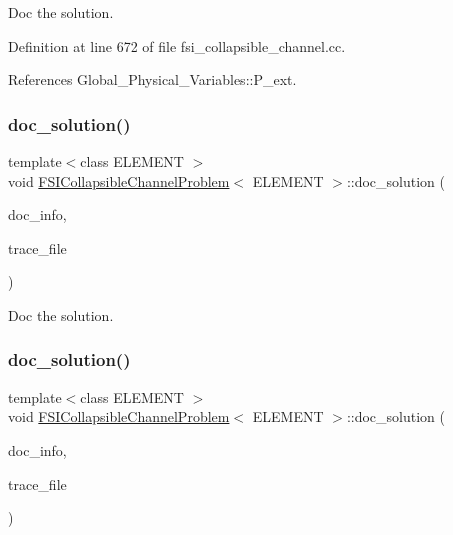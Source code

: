 Doc the solution. 



Definition at line 672 of file fsi\+\_\+collapsible\+\_\+channel.\+cc.



References Global\+\_\+\+Physical\+\_\+\+Variables\+::\+P\+\_\+ext.

\mbox{\label{classFSICollapsibleChannelProblem_aff5cacbc8d81f6c1beda947085496462}} 
\subsubsection{\texorpdfstring{doc\+\_\+solution()}{doc\_solution()}\hspace{0.1cm}{\footnotesize\ttfamily [2/4]}}
{\footnotesize\ttfamily template$<$class E\+L\+E\+M\+E\+NT $>$ \\
void \hyperlink{classFSICollapsibleChannelProblem}{F\+S\+I\+Collapsible\+Channel\+Problem}$<$ E\+L\+E\+M\+E\+NT $>$\+::doc\+\_\+solution (\begin{DoxyParamCaption}\item[{Doc\+Info \&}]{doc\+\_\+info,  }\item[{ofstream \&}]{trace\+\_\+file }\end{DoxyParamCaption})}



Doc the solution. 

\mbox{\label{classFSICollapsibleChannelProblem_aff5cacbc8d81f6c1beda947085496462}} 
\subsubsection{\texorpdfstring{doc\+\_\+solution()}{doc\_solution()}\hspace{0.1cm}{\footnotesize\ttfamily [3/4]}}
{\footnotesize\ttfamily template$<$class E\+L\+E\+M\+E\+NT $>$ \\
void \hyperlink{classFSICollapsibleChannelProblem}{F\+S\+I\+Collapsible\+Channel\+Problem}$<$ E\+L\+E\+M\+E\+NT $>$\+::doc\+\_\+solution (\begin{DoxyParamCaption}\item[{Doc\+Info \&}]{doc\+\_\+info,  }\item[{ofstream \&}]{trace\+\_\+file }\end{DoxyParamCaption})}



